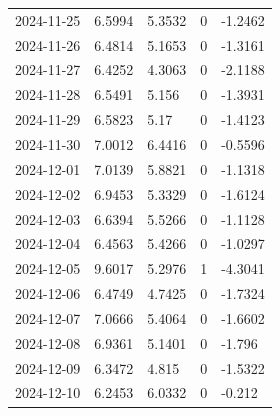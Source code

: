 {\begin{longtable}{@{}lllll@{}}
2024-11-25 & 6.5994 & 5.3532 & 0 & -1.2462 \\
2024-11-26 & 6.4814 & 5.1653 & 0 & -1.3161 \\
2024-11-27 & 6.4252 & 4.3063 & 0 & -2.1188 \\
2024-11-28 & 6.5491 & 5.156 & 0 & -1.3931 \\
2024-11-29 & 6.5823 & 5.17 & 0 & -1.4123 \\
2024-11-30 & 7.0012 & 6.4416 & 0 & -0.5596 \\
2024-12-01 & 7.0139 & 5.8821 & 0 & -1.1318 \\
2024-12-02 & 6.9453 & 5.3329 & 0 & -1.6124 \\
2024-12-03 & 6.6394 & 5.5266 & 0 & -1.1128 \\
2024-12-04 & 6.4563 & 5.4266 & 0 & -1.0297 \\
2024-12-05 & 9.6017 & 5.2976 & 1 & -4.3041 \\
2024-12-06 & 6.4749 & 4.7425 & 0 & -1.7324 \\
2024-12-07 & 7.0666 & 5.4064 & 0 & -1.6602 \\
2024-12-08 & 6.9361 & 5.1401 & 0 & -1.796 \\
2024-12-09 & 6.3472 & 4.815 & 0 & -1.5322 \\
2024-12-10 & 6.2453 & 6.0332 & 0 & -0.212 \\
\bottomrule
\end{longtable}}
